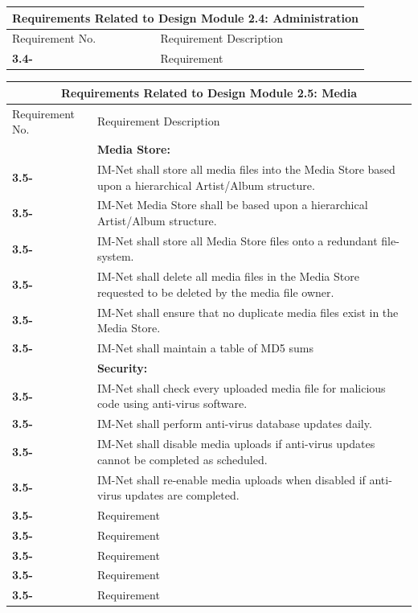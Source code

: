 \documentclass[letterpaper,12pt]{article}
\newcounter{rcounter}						%
\newcommand\rnumber{\stepcounter{rcounter}\arabic{rcounter}}
\begin{document}
{\setcounter{rcounter}{0}
\begin{center}
\begin{tabular}{|l|p{6in}|}
\hline 
\multicolumn{2}{|c|}{\textbf{Requirements Related to Design Module 2.4: Administration}} \\ 
\hline 
Requirement No. & Requirement Description \\ 
\hline
\textbf{3.4-\rnumber} & Requirement \\ 
\hline 
\end{tabular} 
\end{center}

\setcounter{rcounter}{0}
\begin{center}
\begin{tabular}{|l|p{6in}|}
\hline 
\multicolumn{2}{|c|}{\textbf{Requirements Related to Design Module 2.5: Media}} \\ 
\hline 
Requirement No. & Requirement Description \\
\hline
& \textbf{Media Store:} \\
\hline
\textbf{3.5-\rnumber} & IM-Net shall store all media files into the Media Store based upon a hierarchical Artist/Album structure. \\ 
\hline
\textbf{3.5-\rnumber} & IM-Net Media Store shall be based upon a hierarchical Artist/Album structure. \\ 
\hline
\textbf{3.5-\rnumber} & IM-Net shall store all Media Store files onto a redundant file-system. \\ 
\hline
\textbf{3.5-\rnumber} & IM-Net shall delete all media files in the Media Store requested to be deleted by the media file owner. \\ 
\hline
\textbf{3.5-\rnumber} & IM-Net shall ensure that no duplicate media files exist in the Media Store. \\ 
\hline
\textbf{3.5-\rnumber} & IM-Net shall maintain a table of MD5 sums  \\ 
\hline
& \textbf{Security:} \\
\hline
\textbf{3.5-\rnumber} & IM-Net shall check every uploaded media file for malicious code using anti-virus software. \\ 
\hline
\textbf{3.5-\rnumber} & IM-Net shall perform anti-virus database updates daily.\\ 
\hline
\textbf{3.5-\rnumber} & IM-Net shall disable media uploads if anti-virus updates cannot be completed as scheduled. \\ 
\hline 
\textbf{3.5-\rnumber} & IM-Net shall re-enable media uploads when disabled if anti-virus updates are completed. \\ 
\hline
\textbf{3.5-\rnumber} & Requirement \\ 
\hline
\textbf{3.5-\rnumber} & Requirement \\ 
\hline
\textbf{3.5-\rnumber} & Requirement \\ 
\hline
\textbf{3.5-\rnumber} & Requirement \\ 
\hline
\textbf{3.5-\rnumber} & Requirement \\ 
\hline
\end{tabular} 
\end{center}

}
\end{document}
